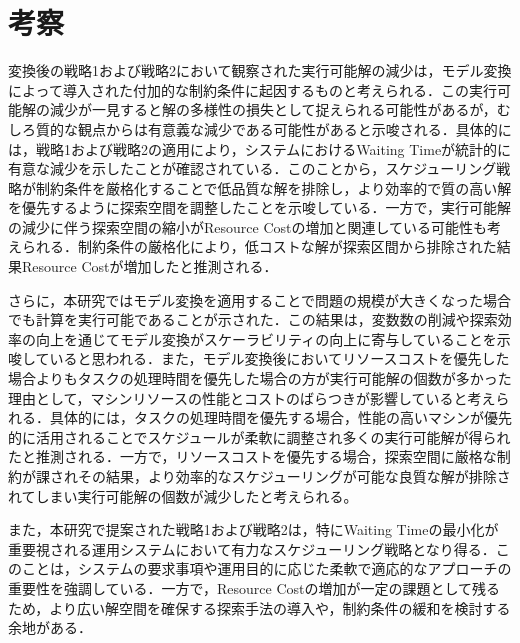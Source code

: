 \section{考察}
変換後の戦略1および戦略2において観察された実行可能解の減少は，モデル変換によって導入された付加的な制約条件に起因するものと考えられる．この実行可能解の減少が一見すると解の多様性の損失として捉えられる可能性があるが，むしろ質的な観点からは有意義な減少である可能性があると示唆される．具体的には，戦略1および戦略2の適用により，システムにおけるWaiting Timeが統計的に有意な減少を示したことが確認されている．このことから，スケジューリング戦略が制約条件を厳格化することで低品質な解を排除し，より効率的で質の高い解を優先するように探索空間を調整したことを示唆している．一方で，実行可能解の減少に伴う探索空間の縮小がResource Costの増加と関連している可能性も考えられる．制約条件の厳格化により，低コストな解が探索区間から排除された結果Resource Costが増加したと推測される．

さらに，本研究ではモデル変換を適用することで問題の規模が大きくなった場合でも計算を実行可能であることが示された．この結果は，変数数の削減や探索効率の向上を通じてモデル変換がスケーラビリティの向上に寄与していることを示唆していると思われる．また，モデル変換後においてリソースコストを優先した場合よりもタスクの処理時間を優先した場合の方が実行可能解の個数が多かった理由として，マシンリソースの性能とコストのばらつきが影響していると考えられる．具体的には，タスクの処理時間を優先する場合，性能の高いマシンが優先的に活用されることでスケジュールが柔軟に調整され多くの実行可能解が得られたと推測される．一方で，リソースコストを優先する場合，探索空間に厳格な制約が課されその結果，より効率的なスケジューリングが可能な良質な解が排除されてしまい実行可能解の個数が減少したと考えられる。

また，本研究で提案された戦略1および戦略2は，特にWaiting Timeの最小化が重要視される運用システムにおいて有力なスケジューリング戦略となり得る．このことは，システムの要求事項や運用目的に応じた柔軟で適応的なアプローチの重要性を強調している．一方で，Resource Costの増加が一定の課題として残るため，より広い解空間を確保する探索手法の導入や，制約条件の緩和を検討する余地がある．
